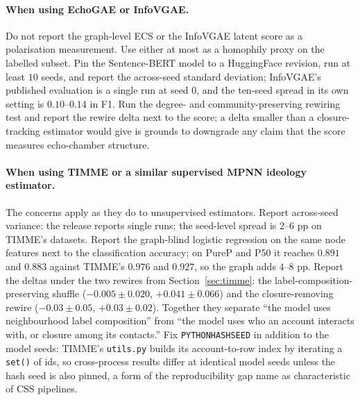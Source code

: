 \documentclass[letterpaper]{article} %
\begin{document}
\paragraph{When using EchoGAE or InfoVGAE.} Do not report the
graph-level ECS or the InfoVGAE latent score as a polarisation
measurement. Use either at most as a homophily proxy on the
labelled subset. Pin the Sentence-BERT model to a HuggingFace
revision, run at least $10$ seeds, and report the across-seed
standard deviation; InfoVGAE's published evaluation is a single
run at seed $0$, and the ten-seed spread in its own setting is
$0.10$--$0.14$ in F1. Run the degree- and community-preserving
rewiring test and report the rewire delta next to the score; a
delta smaller than a closure-tracking estimator would give is
grounds to downgrade any claim that the score measures
echo-chamber structure.

\paragraph{When using TIMME or a similar supervised MPNN
ideology estimator.} The
\citet{Schoch2024Reproducibility, JacobsWallach2021} concerns
apply as they do to unsupervised estimators. Report
across-seed variance: the release reports single runs; the
seed-level spread is $2$--$6$ pp on TIMME's datasets. Report
the graph-blind logistic regression on the same node features
next to the classification accuracy; on PureP and P50 it
reaches $0.891$ and $0.883$ against TIMME's $0.976$ and
$0.927$, so the graph adds $4$--$8$ pp. Report the deltas
under the two rewires from Section~\ref{sec:timme}: the
label-composition-preserving shuffle
($-0.005 \pm 0.020$, $+0.041 \pm 0.066$) and the
closure-removing rewire ($-0.03 \pm 0.05$, $+0.03 \pm 0.02$).
Together they separate ``the model uses neighbourhood label
composition'' from ``the model uses who an account interacts
with, or closure among its contacts.'' Fix
\texttt{PYTHONHASHSEED} in addition to the model seeds:
TIMME's \texttt{utils.py} builds its account-to-row index by
iterating a \texttt{set()} of ids, so cross-process results
differ at identical model seeds unless the hash seed is also
pinned, a form of the reproducibility gap
\citet{LazerObstacles2020} name as characteristic of CSS
pipelines.
\end{document}
